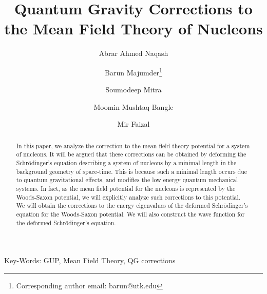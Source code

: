 \documentclass[12pt]{article}
\begin{document}
\title{Quantum Gravity Corrections to the Mean Field Theory of  Nucleons}


\author[1]{Abrar Ahmed Naqash}
\author[2]{Barun Majumder\footnote{Corresponding author email: barun@utk.edu}}
\author[3]{Soumodeep Mitra}
\author[4]{Moomin Mushtaq Bangle}
\author[5,6,7]{Mir Faizal}



 \date{}
 \maketitle


\begin{abstract}
 In this paper, we analyze the correction to the  mean field theory  potential for a system of  nucleons. It will be argued that these corrections can be obtained by deforming the Schr\"{o}dinger's equation describing a  system of nucleons by  a minimal length in the background geometry of space-time. This is because such  a minimal length occurs due to quantum gravitational effects, and modifies the low energy quantum mechanical systems. In fact, as the  mean field potential for the nucleons is represented by the  Woods-Saxon potential, we will explicitly analyze such corrections to this potential. We will  obtain the corrections to the energy eigenvalues of the deformed Schr\"{o}dinger's equation for the Woods-Saxon potential. We will also construct the wave function for the deformed Schr\"{o}dinger's equation. 
\vspace{0.5cm}
\end{abstract}
Key-Words: GUP, Mean Field Theory, QG corrections
\end{document}
